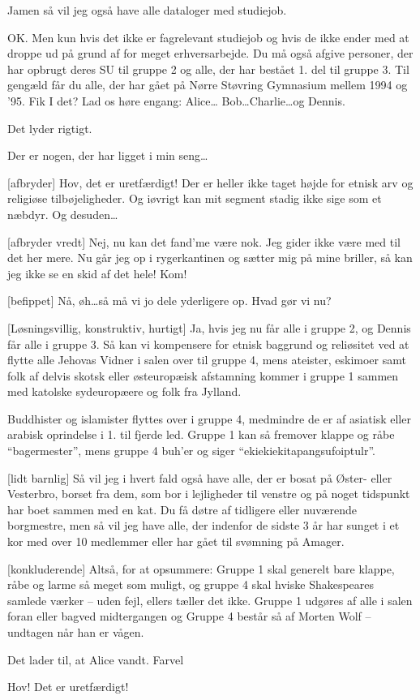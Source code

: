 \documentclass[a4paper,11pt]{article}
\begin{document}
\begin{sketch}
 Jamen så vil jeg også have alle dataloger med studiejob.

 OK. Men kun hvis det ikke er fagrelevant studiejob og hvis
de ikke ender med at droppe ud på grund af for meget erhversarbejde.
Du må også afgive personer, der har opbrugt deres SU til gruppe 2 og
alle, der har bestået 1. del til gruppe 3. Til gengæld får du alle,
der har gået på Nørre Støvring Gymnasium mellem 1994 og '95.
 Fik I det? Lad os høre engang: Alice\ldots
Bob\ldots Charlie\ldots og Dennis.

Det lyder rigtigt. 

  Der er nogen, der har ligget i min
seng\ldots

[afbryder] Hov, det er uretfærdigt! Der er heller ikke taget
højde for etnisk arv og religiøse tilbøjeligheder. Og iøvrigt kan mit
segment stadig ikke sige som et næbdyr. Og desuden\ldots

[afbryder vredt] Nej, nu kan det fand'me være nok. Jeg gider
ikke være med til det her mere. Nu går jeg op i rygerkantinen og
sætter mig på mine briller, så kan jeg ikke se en skid af det hele!
Kom! 

[befippet] Nå, øh\ldots så må vi jo dele yderligere op.
 Hvad gør vi nu?

[Løsningsvillig, konstruktiv, hurtigt] Ja, hvis jeg nu
får alle i gruppe 2, og Dennis får alle i gruppe 3. Så kan vi
kompensere for etnisk baggrund og reliøsitet ved at flytte alle
Jehovas Vidner i salen over til gruppe 4, mens ateister, eskimoer samt
folk af delvis skotsk eller østeuropæisk afstamning kommer i gruppe 1
sammen med katolske sydeuropæere og folk fra Jylland. 

Buddhister og islamister flyttes over i gruppe 4, medmindre de er af
asiatisk eller arabisk oprindelse i 1. til fjerde led. Gruppe 1 kan så
fremover klappe og råbe ``bagermester'', mens gruppe 4 buh'er og siger
``ekiekieki\-tapangsufoiptulr''.

[lidt barnlig] Så vil jeg i hvert fald også have alle, der er bosat
på Øster- eller Vesterbro, borset fra dem, som bor i lejligheder til venstre
og på noget tidspunkt har boet sammen med en kat. Du få døtre af
tidligere eller nuværende borgmestre, men så vil jeg have alle, der indenfor
de sidste 3 år har sunget i et kor med over 10 medlemmer eller har gået til
svømning på Amager.

[konkluderende] Altså, for at opsummere: Gruppe 1 skal
generelt bare klappe, råbe og larme så meget som muligt, og gruppe 4
skal hviske Shakespeares samlede værker -- uden fejl, ellers tæller
det ikke. Gruppe 1 udgøres af alle i salen foran eller bagved
midtergangen og Gruppe 4 består så af Morten Wolf -- undtagen når han
er vågen.

Det lader til, at Alice vandt. Farvel 


 Hov! Det er uretfærdigt!

\end{sketch}
\end{document}
